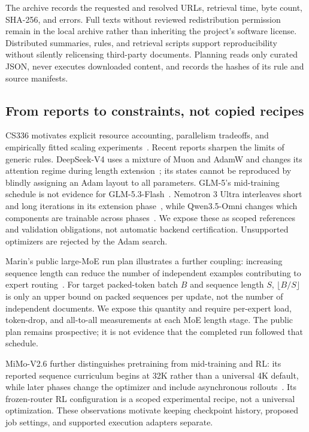 \documentclass[10pt]{article}
\begin{document}
The archive records the requested and resolved URLs, retrieval time, byte count, SHA-256, and errors. Full texts without reviewed redistribution permission remain in the local archive rather than inheriting the project's software license. Distributed summaries, rules, and retrieval scripts support reproducibility without silently relicensing third-party documents. Planning reads only curated JSON, never executes downloaded content, and records the hashes of its rule and source manifests.

\subsection{From reports to constraints, not copied recipes}
CS336 motivates explicit resource accounting, parallelism tradeoffs, and empirically fitted scaling experiments~\cite{cs336}. Recent reports sharpen the limits of generic rules. DeepSeek-V4 uses a mixture of Muon and AdamW and changes its attention regime during length extension~\cite{deepseek4}; its states cannot be reproduced by blindly assigning an Adam layout to all parameters. GLM-5's mid-training schedule is not evidence for GLM-5.3-Flash~\cite{glm5}. Nemotron 3 Ultra interleaves short and long iterations in its extension phase~\cite{nemotron}, while Qwen3.5-Omni changes which components are trainable across phases~\cite{qwenomni}. We expose these as scoped references and validation obligations, not automatic backend certification. Unsupported optimizers are rejected by the Adam search.

Marin's public large-MoE run plan illustrates a further coupling: increasing sequence length can reduce the number of independent examples contributing to expert routing~\cite{marin}. For target packed-token batch $B$ and sequence length $S$, $\lfloor B/S\rfloor$ is only an upper bound on packed sequences per update, not the number of independent documents. We expose this quantity and require per-expert load, token-drop, and all-to-all measurements at each MoE length stage. The public plan remains prospective; it is not evidence that the completed run followed that schedule.

MiMo-V2.6 further distinguishes pretraining from mid-training and RL: its reported sequence curriculum begins at 32K rather than a universal 4K default, while later phases change the optimizer and include asynchronous rollouts~\cite{mimo}. Its frozen-router RL configuration is a scoped experimental recipe, not a universal optimization. These observations motivate keeping checkpoint history, proposed job settings, and supported execution adapters separate.
\end{document}
